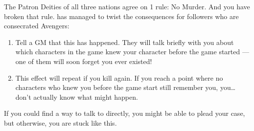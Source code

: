 \documentclass[green]{GL2020}
\begin{document}
\name{\gMurderChup{}}

The Patron Deities of all three nations agree on 1 rule: No Murder. And you have broken that rule. \cGenesis{} has managed to twist the consequences for \cGenesis{\their} followers who are consecrated Avengers:

\begin{enumerate}
  \item Tell a GM that this has happened. They will talk briefly with you about which characters in the game knew your character before the game started — one of them will soon forget you ever existed!
  \item This effect will repeat if you kill again. If you reach a point where no characters who knew you before the game start still remember you, you\ldots{} don’t actually know what might happen.
\end{enumerate}

If you could find a way to talk to \cGenesis{} directly, you might be able to plead your case, but otherwise, you are stuck like this.
\end{document}
